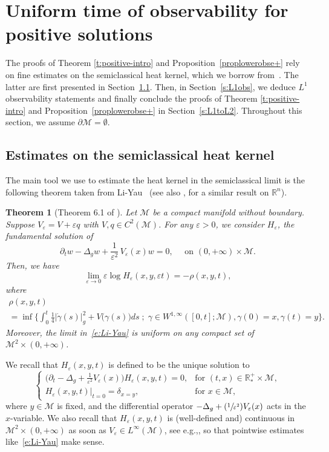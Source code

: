 \documentclass[11pt]{article}
\newcommand{\eg}{e.g.,\xspace}
\numberwithin{equation}{section}
\newcommand{\Psfrac}[2]{(\sfrac{#1}{#2})}
\newcommand{\sep}{\;;\;}
\newtheorem{theorem}[lemma]{Theorem}
\theoremstyle{definition}
\newcommand{\M}{\ensuremath{\mathcal M}}
\newcommand{\mb}[1]{\ensuremath{\mathbb{#1}}}
\newcommand{\R}{{\mb{R}}}
\let\d\partial
\let\e\varepsilon
\let\eps\varepsilon
\begin{document}
\section{Uniform time of observability for positive solutions}
\label{s:positive}

The proofs of Theorem \ref{t:positive-intro} and Proposition~\ref{proplowerobse+} rely on fine estimates on the semiclassical heat kernel, which we borrow from~\cite{LY86}. The latter are first presented in Section~\ref{s:Li-Yau}. Then, in Section~\ref{s:L1obs}, we deduce $L^1$ observability statements and finally conclude the proofs of Theorem \ref{t:positive-intro} and Proposition~\ref{proplowerobse+} in Section~\ref{s:L1toL2}.
Throughout this section, we assume $\d\M=\emptyset$.

\subsection{Estimates on the semiclassical heat kernel}
\label{s:Li-Yau}
The main tool we use to estimate the heat kernel in the semiclassical limit is the following theorem taken from Li-Yau~\cite{LY86} (see also \cite{Simon:83}, for a similar result on $\R^{n}$).
\begin{theorem}[Theorem 6.1 of \cite{LY86}]
\label{t:thm-LiYau}
Let $\M$ be a compact manifold without boundary. Suppose $V_\eps = V + \eps q$ with $V,q \in C^2(\M)$. For any $\e>0$, we consider $H_{\e}$, the fundamental solution of
\[
\partial_t w-\Delta_g w+\frac{1}{\e^2}\,V_\eps (x)w=0, \quad \text{ on }(0,+\infty)\times \M.
\]
Then, we have
\begin{equation}
\label{e:Li-Yau}
\underset{\e\to 0}{\lim}\e \log H_{\e}(x,y,\e t)=-\rho(x,y,t),
\end{equation}
where
\begin{multline}
\label{e:def-rho-V}
\rho(x,y,t)\\
= \inf \biggl\{ \int_0^t \frac{1}{4}|\dot{\gamma}(s)|_g^2 +V \big( \gamma(s) \big)ds\sep \gamma \in W^{1,\infty} ([0,t] ; \M ), \gamma(0)=x, \gamma(t)= y \biggr\}.
\end{multline}
Moreover, the limit in~\eqref{e:Li-Yau} is uniform on any compact set of $\M^2\times (0,+\infty)$.
\end{theorem}
We recall that $H_\eps(x,y,t)$ is defined to be the unique solution to
\begin{equation}
\label{e:heat-kernel-def}
\begin{cases}
\Big(\d_t -\Delta_g+\frac{1}{\e^2} V_\eps(x) \Big) H_{\e}(x,y,t)= 0, & \text{for } (t,x) \in \R^+_*\times \M, \\
H_{\e}(x,y,t) |_{t=0} = \delta_{x=y}, & \text{for } x \in \M,
\end{cases}
\end{equation}
where $y \in \M$ is fixed, and the differential operator $ -\Delta_g+\Psfrac{1}{\e^2} V_\eps(x)$ acts in the $x$\nobreakdash-variable.
We also recall that $H_{\e}(x,y,t)$ is (well-defined and) continuous in \hbox{$\M^2\times (0,+\infty)$} as soon as $V_\eps\in L^\infty(\M)$, see \eg \cite[Th.\,B.7.1\,(a$'''$)]{Simon:82}, so that pointwise estimates like~\eqref{e:Li-Yau} make sense.
\end{document}
